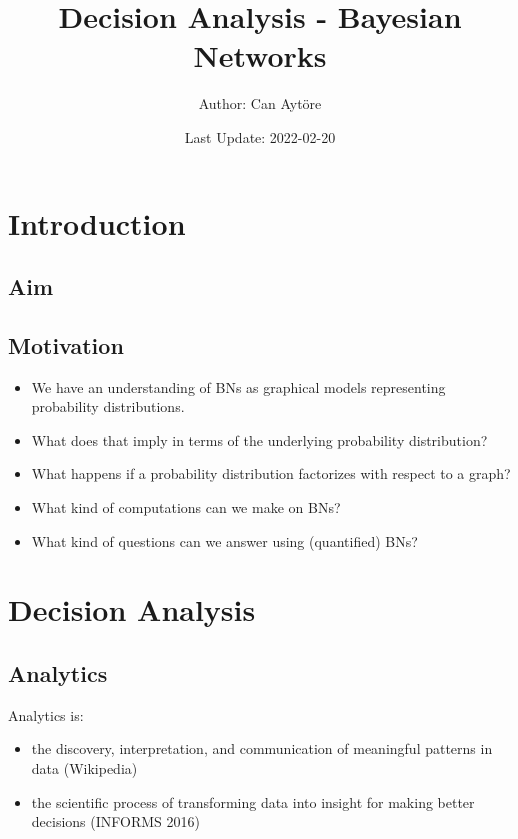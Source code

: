 \documentclass[
]{article}
\title{Decision Analysis - Bayesian Networks}
\author{Author: Can Aytöre}
\date{Last Update: 2022-02-20}
\providecommand{\tightlist}{%
  \setlength{\itemsep}{0pt}\setlength{\parskip}{0pt}}
\begin{document}
\maketitle

{
\setcounter{tocdepth}{2}
\tableofcontents
}
\hypertarget{introduction}{%
\section{Introduction}\label{introduction}}

\hypertarget{aim}{%
\subsection{Aim}\label{aim}}

\hypertarget{motivation}{%
\subsection{Motivation}\label{motivation}}

\begin{itemize}
\tightlist
\item
  We have an understanding of BNs as graphical models representing probability distributions.
\item
  What does that imply in terms of the underlying probability distribution?
\item
  What happens if a probability distribution factorizes with respect to a graph?
\item
  What kind of computations can we make on BNs?
\item
  What kind of questions can we answer using (quantified) BNs?
\end{itemize}

\hypertarget{decision-analysis}{%
\section{Decision Analysis}\label{decision-analysis}}

\hypertarget{analytics}{%
\subsection{Analytics}\label{analytics}}

Analytics is:

\begin{itemize}
\tightlist
\item
  the discovery, interpretation, and communication of meaningful patterns in data (Wikipedia)
\item
  the scientific process of transforming data into insight for making better decisions (INFORMS 2016)
\end{itemize}
\end{document}
